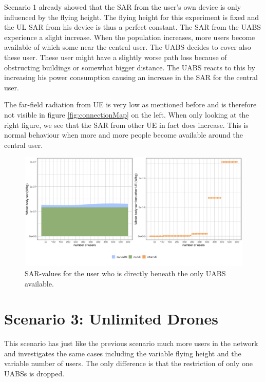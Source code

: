 Scenario 1 already showed that the \gls{SAR} from the user's own device is only influenced by the flying height. 
The flying height for this experiment is fixed and the \gls{UL} \gls{SAR} from his device is thus a perfect constant.
The \gls{SAR} from the \gls{UABS} experience a slight  increase. When the population increases, more users become available 
of which some near the central user. The \gls{UABS} decides to cover also these user. These user might have a slightly 
worse path loss because of obstructing buildings or somewhat bigger distance. The \gls{UABS} reacts to this by increasing 
his power consumption causing an increase in the \gls{SAR} for the central user.

The far-field radiation from \gls{UE} is very low as mentioned before and is therefore not visible in figure \ref{fig:connectionMap} 
on the left. When only looking at the right figure, we see that the \gls{SAR}  from other \gls{UE} in fact does increase. This is normal 
behaviour when more and more people become available around the central user.

\begin{figure}[h!]
\centering
  \includegraphics[width=\textwidth/6*5]{../results/s2/uvsulsarcentralUser.png}
  \caption{SAR-values for the user who is directly beneath the only UABS available.}
  \label{fig:uvsulsarcentralUsers}
\end{figure}
\section{Scenario 3: Unlimited Drones}
\label{s3}

This scenario has just like the previous scenario much more users in the network 
and investigates the same cases including the variable flying height and the variable number of  users.
The only difference is that the restriction of only one \gls{UABS}s is dropped.

